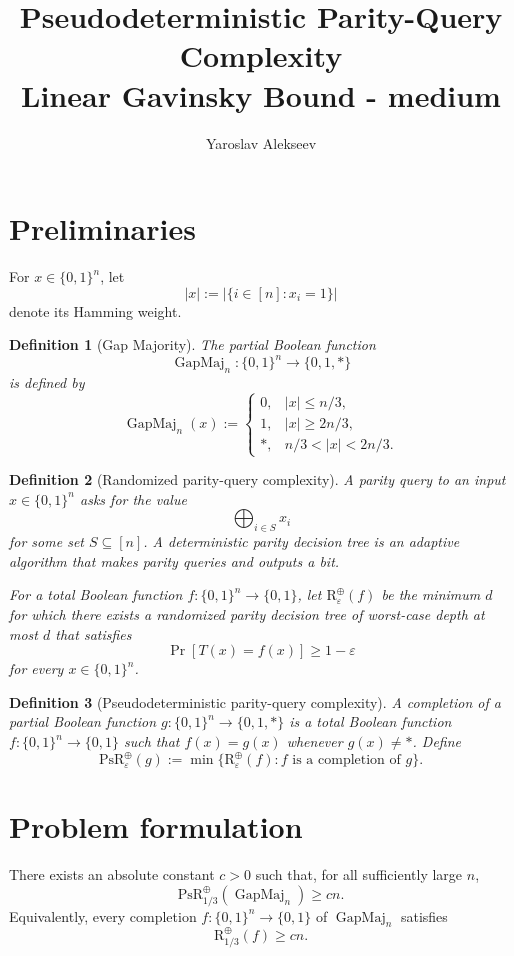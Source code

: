 \documentclass[10pt]{article}
\title{Pseudodeterministic Parity-Query Complexity\\Linear Gavinsky Bound - medium}
\author{Yaroslav Alekseev}
\date{}
\newtheorem{definition}{Definition}
\begin{document}
\maketitle

\section{Preliminaries}

For $x\in\{0,1\}^n$, let
\[
|x|:=\bigl|\{i\in[n]:x_i=1\}\bigr|
\]
denote its Hamming weight.

\begin{definition}[Gap Majority]
The partial Boolean function
\[
\operatorname{GapMaj}_n:\{0,1\}^n\longrightarrow\{0,1,*\}
\]
is defined by
\[
\operatorname{GapMaj}_n(x):=
\begin{cases}
0, & |x|\le n/3,\\
1, & |x|\ge 2n/3,\\
*, & n/3<|x|<2n/3.
\end{cases}
\]
\end{definition}

\begin{definition}[Randomized parity-query complexity]
A \emph{parity query} to an input $x\in\{0,1\}^n$ asks for the value
\[
\bigoplus_{i\in S}x_i
\]
for some set $S\subseteq[n]$. A deterministic parity decision tree is an
adaptive algorithm that makes parity queries and outputs a bit.

For a total Boolean function $f:\{0,1\}^n\to\{0,1\}$, let
$\mathrm{R}^{\oplus}_\varepsilon(f)$ be the minimum $d$ for which there
exists a randomized parity decision tree of worst-case depth at most $d$
that satisfies
\[
\Pr[T(x)=f(x)]\ge 1-\varepsilon
\]
for every $x\in\{0,1\}^n$.
\end{definition}

\begin{definition}[Pseudodeterministic parity-query complexity]
A \emph{completion} of a partial Boolean function
$g:\{0,1\}^n\to\{0,1,*\}$ is a total Boolean function
$f:\{0,1\}^n\to\{0,1\}$ such that $f(x)=g(x)$ whenever $g(x)\neq *$.
Define
\[
\mathrm{PsR}^{\oplus}_\varepsilon(g)
:=
\min\bigl\{\mathrm{R}^{\oplus}_\varepsilon(f):
             f\text{ is a completion of }g\bigr\}.
\]
\end{definition}

\section{Problem formulation}

There exists an absolute constant $c>0$ such that, for all sufficiently
large $n$,
\[
\mathrm{PsR}^{\oplus}_{1/3}(\operatorname{GapMaj}_n)\ge cn.
\]
Equivalently, every completion $f:\{0,1\}^n\to\{0,1\}$ of
$\operatorname{GapMaj}_n$ satisfies
\[
\mathrm{R}^{\oplus}_{1/3}(f)\ge cn.
\]
\end{document}
